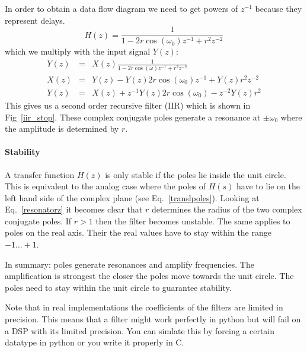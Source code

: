 \documentclass[12pt,a4paper]{article}
\begin{document}
In order to obtain a data flow diagram we need to get powers of $z^{-1}$
because they represent delays.
\begin{equation}
H(z) = \frac{1}{1 - 2 r \cos(\omega_{0}) z^{-1} + r^{2} z^{-2}} 
\end{equation}
which we multiply with the input signal $Y(z)$:
\begin{eqnarray} 
Y(z) & = & X(z) \frac{1}{1 - 2 r \cos (\omega) z^{-1} + r^{2} z^{-2}} \\
X(z) & = & Y(z) - Y(z) 2r \cos (\omega_{0}) z^{-1} + Y(z) r^{2} z^{-2} \\
Y(z) & = & X(z) + z^{-1} Y(z) 2r \cos (\omega_{0}) - z^{-2} Y(z) r^{2}
\end{eqnarray}
This gives us a second order recursive filter (IIR) which is
shown in Fig~\ref{iir_stop}. These complex
conjugate poles generate a resonance at $\pm\omega_0$ where the
amplitude is determined by $r$.

\paragraph{Stability}
A transfer function $H(z)$ is only stable if the poles lie inside the
unit circle. This is equivalent to the analog case where the poles of
$H(s)$ have to lie on the left hand side of the complex plane (see
Eq.~\ref{translpoles}). Looking at Eq.~\ref{resonatorz} it becomes
clear that $r$ determines the radius of the two complex conjugate poles. If
$r>1$ then the filter becomes unstable. The same applies to poles on
the real axis. Their the real values have to stay within the range $-1
\ldots +1$.

In summary: poles generate resonances and amplify frequencies. The
amplification is strongest the closer the poles move towards the unit
circle. The poles need to stay within the unit circle to guarantee
stability. 

Note that in real implementations the coefficients of the
filters are limited in precision. This means that a filter might
work perfectly in python but will fail on a DSP with its limited
precision. You can simlate this by forcing a certain datatype
in python or you write it properly in C.
\end{document}
